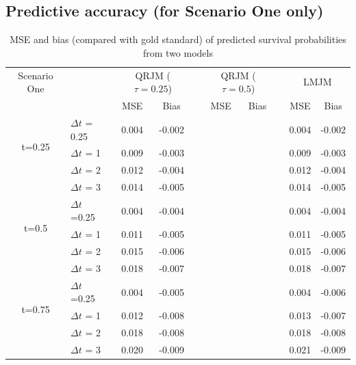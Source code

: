 \documentclass{article}
\begin{document}




\subsection{Predictive accuracy (for Scenario One only)}

\begin{table}[H]
\centering
\caption{MSE and bias (compared with gold standard) of predicted survival probabilities from two models}
\begin{tabular}{clcccccccc}
\hline
Scenario One & & \multicolumn{2}{c}{QRJM ($\tau=0.25$)} & &\multicolumn{2}{c}{QRJM ($\tau=0.5$)} & & \multicolumn{2}{c}{LMJM} \\
\cline{3-4}\cline{6-7}\cline{9-10}
 & & MSE & Bias & & MSE & Bias & & MSE & Bias \\
\hline
\multirow{3}{*}{t=0.25} & $\Delta t$ = 0.25 & 0.004 & -0.002 &&  & && 0.004 & -0.002 \\
& $\Delta t$ = 1 & 0.009 & -0.003 && & && 0.009 & -0.003 \\
& $\Delta t$ = 2 & 0.012 & -0.004 && & && 0.012 & -0.004 \\
& $\Delta t$ = 3 & 0.014 & -0.005 && & && 0.014 & -0.005 \\
\hline
\multirow{3}{*}{t=0.5} & $\Delta t$ =0.25  & 0.004 & -0.004 && & && 0.004 & -0.004 \\
& $\Delta t$ = 1 & 0.011 & -0.005 && & && 0.011 & -0.005 \\
& $\Delta t$ = 2 & 0.015 & -0.006 && & && 0.015 & -0.006 \\
& $\Delta t$ = 3 & 0.018 & -0.007 && & && 0.018 & -0.007 \\
\hline
\multirow{3}{*}{t=0.75} & $\Delta t$ =0.25 & 0.004 & -0.005 && & && 0.004 & -0.006 \\
& $\Delta t$ = 1 & 0.012 & -0.008 && & && 0.013 & -0.007 \\
& $\Delta t$ = 2 & 0.018 & -0.008 && & && 0.018 & -0.008 \\
& $\Delta t$ = 3 & 0.020 & -0.009 && & && 0.021 & -0.009  \\
\hline
\end{tabular}
\end{table}
\end{document}
